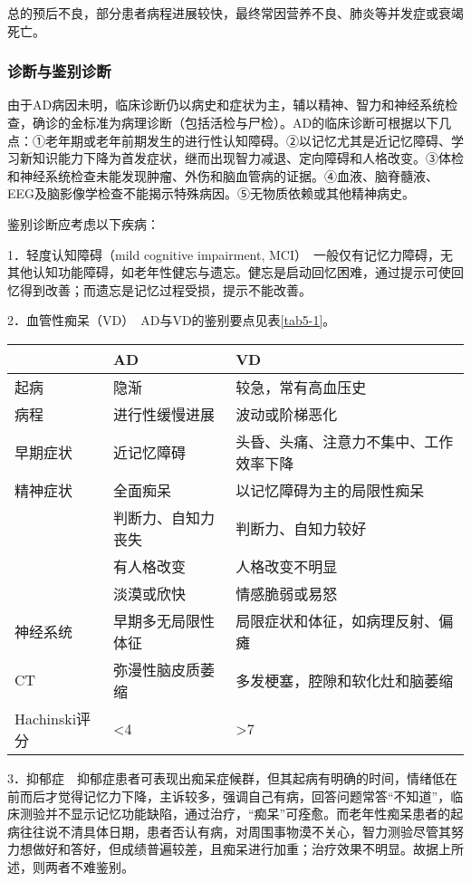 总的预后不良，部分患者病程进展较快，最终常因营养不良、肺炎等并发症或衰竭死亡。

\subsubsection{诊断与鉴别诊断}

由于AD病因未明，临床诊断仍以病史和症状为主，辅以精神、智力和神经系统检查，确诊的金标准为病理诊断（包括活检与尸检）。AD的临床诊断可根据以下几点：①老年期或老年前期发生的进行性认知障碍。②以记忆尤其是近记忆障碍、学习新知识能力下降为首发症状，继而出现智力减退、定向障碍和人格改变。③体检和神经系统检查未能发现肿瘤、外伤和脑血管病的证据。④血液、脑脊髓液、EEG及脑影像学检查不能揭示特殊病因。⑤无物质依赖或其他精神病史。

鉴别诊断应考虑以下疾病：

1．轻度认知障碍（mild cognitive impairment,
MCI）　一般仅有记忆力障碍，无其他认知功能障碍，如老年性健忘与遗忘。健忘是启动回忆困难，通过提示可使回忆得到改善；而遗忘是记忆过程受损，提示不能改善。

2．血管性痴呆（VD）　AD与VD的鉴别要点见表\ref{tab5-1}。

\begin{table}[ht]
    \caption{AD与VD的鉴别}
    \label{tab5-1}
    \centering
    \begin{longtable}{lp{5cm}p{7cm}}
    \toprule
    & AD & VD \\
    \midrule
    起病 & 隐渐 & 较急，常有高血压史\\
    病程 & 进行性缓慢进展 & 波动或阶梯恶化\\
    早期症状 & 近记忆障碍 & 头昏、头痛、注意力不集中、工作效率下降\\
    精神症状 & 全面痴呆 & 以记忆障碍为主的局限性痴呆\\
    & 判断力、自知力丧失 & 判断力、自知力较好\\
    & 有人格改变 & 人格改变不明显 \\
    & 淡漠或欣快 & 情感脆弱或易怒 \\
    神经系统 & 早期多无局限性体征 & 局限症状和体征，如病理反射、偏瘫\\
    CT & 弥漫性脑皮质萎缩 & 多发梗塞，腔隙和软化灶和脑萎缩\\
    Hachinski评分 & <4 & >7\\
    \bottomrule
    \end{longtable}
  \end{table}

3．抑郁症　抑郁症患者可表现出痴呆症候群，但其起病有明确的时间，情绪低在前而后才觉得记忆力下降，主诉较多，强调自己有病，回答问题常答``不知道''，临床测验并不显示记忆功能缺陷，通过治疗，``痴呆''可痊愈。而老年性痴呆患者的起病往往说不清具体日期，患者否认有病，对周围事物漠不关心，智力测验尽管其努力想做好和答好，但成绩普遍较差，且痴呆进行加重；治疗效果不明显。故据上所述，则两者不难鉴别。

